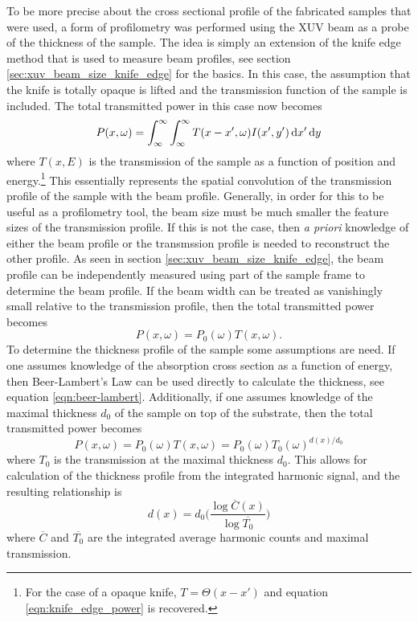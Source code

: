 To be more precise about the cross sectional profile of the fabricated samples that were used, a form of profilometry was performed using the XUV beam as a probe of the thickness of the sample.  The idea is simply an extension of the knife edge method that is used to measure beam profiles, see section \ref{sec:xuv_beam_size_knife_edge} for the basics.  In this case, the assumption that the knife is totally opaque is lifted and the transmission function of the sample is included.  The total transmitted power in this case now becomes
\begin{equation}
	\label{eqn:transmission_knife_edge_power}
	P(x, \omega) = \int_{\infty}^{\infty}\int_{\infty}^{\infty} T(x - x', \omega) I(x', y')\mathop{}\!\mathrm{d} x' \mathop{}\!\mathrm{d} y
\end{equation}
where $T(x, E)$ is the transmission of the sample as a function of position and energy.\footnote{For the case of a opaque knife, $T = \Theta(x - x')$ and equation \ref{eqn:knife_edge_power} is recovered.} This essentially represents the spatial convolution of the transmission profile of the sample with the beam profile.  Generally, in order for this to be useful as a profilometry tool, the beam size must be much smaller the feature sizes of the transmission profile.  If this is not the case, then \emph{a priori} knowledge of either the beam profile or the transmssion profile is needed to reconstruct the other profile.  As seen in section \ref{sec:xuv_beam_size_knife_edge}, the beam profile can be independently measured using part of the sample frame to determine the beam profile.  If the beam width can be treated as vanishingly small relative to the transmission profile, then the total transmitted power becomes
\begin{equation}
	\label{eqn:knife_edge_delta}
	P(x,\omega) = P_0(\omega)T(x,\omega).
\end{equation}
To determine the thickness profile of the sample some assumptions are need.  If one assumes knowledge of the absorption cross section as a function of energy, then Beer-Lambert's Law can be used directly to calculate the thickness, see equation \ref{eqn:beer-lambert}.  Additionally, if one assumes knowledge of the maximal thickness $d_0$ of the sample on top of the substrate, then the total transmitted power becomes
\begin{equation}
	\label{eqn:trans_power_thickness_assumed}
	P(x,\omega) = P_0(\omega)T(x,\omega) = P_0(\omega)T_0(\omega)^{d(x)/d_0}
\end{equation} 
where $T_0$ is the transmission at the maximal thickness $d_0$.  This allows for calculation of the thickness profile from the integrated harmonic signal, and the resulting relationship is 
\begin{equation}
	\label{eqn:thickness_calc}
	d(x) = d_0\bigg(\frac{\log \overline{C}(x)}{\log \overline{T_0}}\bigg)
\end{equation}
where $\overline{C}$ and $\overline{T_0}$ are the integrated average harmonic counts and maximal transmission.

